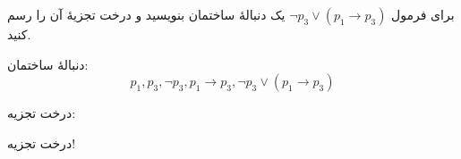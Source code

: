 برای فرمول
$\neg p_3\vee (p_1\to p_3)$
یک دنبالهٔ ساختمان بنویسید و درخت تجزیهٔ آن را رسم کنید.
\begin{ans}
    دنبالهٔ ساختمان:
    $$
    p_1,p_3,\neg p_3,p_1\to p_3,\neg p_3\vee (p_1\to p_3)
    $$

    درخت تجزیه:

    \begin{center}
        درخت تجزیه!
    \end{center}
\end{ans}
